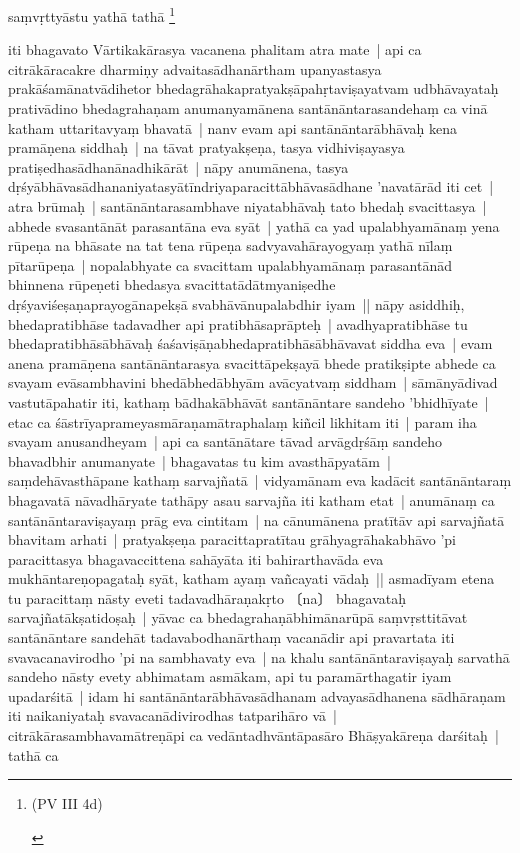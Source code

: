 \documentclass[article,a4paper]{memoir}
\begin{document}
	  \pstart saṃvṛttyā\-stu yathā\- tathā\- \footnote{\begin{english}(PV III 4d)\end{english}}
	\pend
      

	  \pstart iti bhagavato Vā\-rtikakā\-rasya vacanena phalitam atra mate | api ca citrā\-kā\-racakre dharmiṇy advaitasā\-dhanā\-rtham upanyastasya prakā\-śamā\-natvā\-dihetor bhedagrā\-hakapratyakṣā\-pahṛtaviṣayatvam udbhā\-vayataḥ prativā\-dino bhedagrahaṇam anumanyamā\-nena santā\-nā\-ntarasandehaṃ ca vinā\- katham uttaritavyaṃ bhavatā\- | \label{thakur75-148.21} nanv evam api santā\-nā\-ntarā\-bhā\-vaḥ kena pramā\-ṇena siddhaḥ | na tā\-vat pratyakṣeṇa, tasya vidhiviṣayasya pratiṣedhasā\-dhanā\-nadhikā\-rā\-t | nā\-py anumā\-nena, tasya dṛśyā\-bhā\-vasā\-dhananiyatasyā\-tī\-ndriyaparacittā\-bhā\-vasā\-dhane 'navatā\-rā\-d iti cet | atra brū\-maḥ | santā\-nā\-ntarasambhave niyatabhā\-vaḥ tato bhedaḥ svacittasya | abhede svasantā\-nā\-t parasantā\-na eva syā\-t | yathā\- ca yad upalabhyamā\-naṃ yena rū\-peṇa na bhā\-sate na tat tena rū\-peṇa sadvyavahā\-rayogyaṃ yathā\- nī\-laṃ pī\-tarū\-peṇa | nopalabhyate ca svacittam upalabhyamā\-naṃ parasantā\-nā\-d bhinnena rū\-peṇeti bhedasya svacittatā\-dā\-tmyaniṣedhe dṛśyaviśeṣaṇaprayogā\-napekṣā\- svabhā\-vā\-nupalabdhir iyam || \label{thakur75-148.28} nā\-py asiddhiḥ, bhedapratibhā\-se tadavadher api pratibhā\-saprā\-pteḥ | avadhyapratibhā\-se tu bhedapratibhā\-sā\-bhā\-vaḥ śaśaviṣā\-ṇabhedapratibhā\-sā\-bhā\-vavat siddha eva | evam anena pramā\-ṇena santā\-nā\-ntarasya svacittā\-pekṣayā\- bhede pratikṣipte abhede ca svayam evā\-sambhavini bhedā\-bhedā\-bhyā\-m avā\-cyatvaṃ siddham | sā\-mā\-nyā\-divad vastutā\-pahatir iti, kathaṃ bā\-dhakā\-bhā\-vā\-t santā\-nā\-ntare sandeho 'bhidhī\-yate | etac ca śā\-strī\-yaprameyasmā\-raṇamā\-traphalaṃ kiñcil likhitam iti | param iha svayam anusandheyam | \label{thakur75-149.3} api ca santā\-nā\-tare tā\-vad arvā\-gdṛśā\-ṃ sandeho bhavadbhir anumanyate | bhagavatas tu kim avasthā\-pyatā\-m | saṃdehā\-vasthā\-pane kathaṃ sarvajñatā\- | vidyamā\-nam eva kadā\-cit santā\-nā\-ntaraṃ bhagavatā\- nā\-vadhā\-ryate tathā\-py asau sarvajña iti katham etat | anumā\-naṃ ca santā\-nā\-ntaraviṣayaṃ prā\-g eva cintitam | na cā\-numā\-nena pratī\-tā\-v api sarvajñatā\- bhavitam arhati | pratyakṣeṇa paracittapratī\-tau grā\-hyagrā\-hakabhā\-vo 'pi paracittasya bhagavaccittena sahā\-yā\-ta iti bahirarthavā\-da eva mukhā\-ntareṇopagataḥ syā\-t, katham ayaṃ vañcayati vā\-daḥ || \label{thakur75-149.9} asmadī\-yam etena tu paracittaṃ nā\-sty eveti tadavadhā\-raṇakṛto 〔na〕 bhagavataḥ sarvajñatā\-kṣatidoṣaḥ | yā\-vac ca bhedagrahaṇā\-bhimā\-narū\-pā\- saṃvṛsttitā\-vat santā\-nā\-ntare sandehā\-t tadavabodhanā\-rthaṃ vacanā\-dir api pravartata iti svavacanavirodho 'pi na sambhavaty eva | na khalu santā\-nā\-ntaraviṣayaḥ sarvathā\- sandeho nā\-sty evety abhimatam asmā\-kam, api tu paramā\-rthagatir iyam upadarśitā\- | idam hi santā\-nā\-ntarā\-bhā\-vasā\-dhanam advayasā\-dhanena sā\-dhā\-raṇam iti naikaniyataḥ svavacanā\-divirodhas tatparihā\-ro vā\- | citrā\-kā\-rasambhavamā\-treṇā\-pi ca vedā\-ntadhvā\-ntā\-pasā\-ro Bhā\-ṣyakā\-reṇa darśitaḥ | tathā\- ca
	\pend
      
\end{document}
